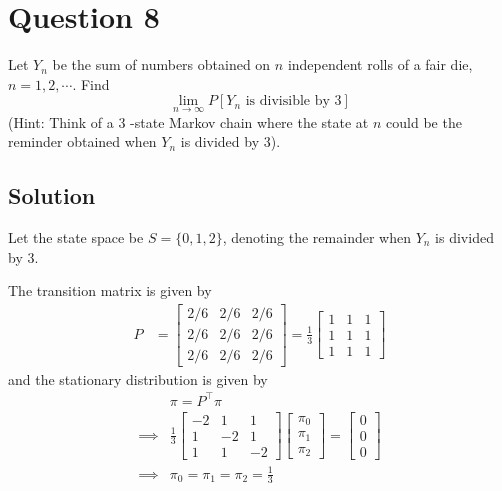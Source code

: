 \section*{Question 8}

Let \( Y_{n} \) be the sum of numbers obtained on \( n \) independent rolls of a fair die, \( n=1,2, \cdots \).
Find
\[
    \lim _{n \rightarrow \infty} P\left[Y_{n} \text { is divisible by } 3\right]
\]
(Hint: Think of a 3 -state Markov chain where the state at \( n \) could be the reminder obtained when \( Y_{n} \) is divided by 3).

\subsection*{Solution}

Let the state space be \( S = \{ 0, 1, 2 \} \), denoting the remainder when \( Y_{n} \) is divided by 3.

The transition matrix is given by
\begin{align*}
    P
     & =
    \begin{bmatrix}
        2/6 & 2/6 & 2/6 \\
        2/6 & 2/6 & 2/6 \\
        2/6 & 2/6 & 2/6
    \end{bmatrix}
    =
    \frac{1}{3}
    \begin{bmatrix}
        1 & 1 & 1 \\
        1 & 1 & 1 \\
        1 & 1 & 1
    \end{bmatrix}
\end{align*}
and the stationary distribution is given by
\begin{align*}
     &
    \pi
    =
    P^\top \pi
    \\
    \implies
     &
    \frac{1}{3}
    \begin{bmatrix}
        -2 & 1  & 1  \\
        1  & -2 & 1  \\
        1  & 1  & -2
    \end{bmatrix}
    \begin{bmatrix}
        \pi_{0} \\
        \pi_{1} \\
        \pi_{2}
    \end{bmatrix}
    =
    \begin{bmatrix}
        0 \\
        0 \\
        0
    \end{bmatrix}
    \\
    \implies
     &
    \boxed{
        \pi_{0} = \pi_{1} = \pi_{2} = \frac{1}{3}
    }
\end{align*}
